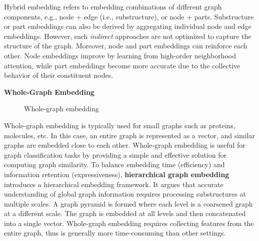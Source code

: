 Hybrid embedding refers to embedding combinations of different graph components, e.g., node + edge (i.e., substructure), or node + parts. Substructure or part embeddings can also be derived by aggregating individual node and edge embeddings. However, such \textit{indirect} approaches are not optimized to capture the structure of the graph. Moreover, node and part embeddings can reinforce each other. Node embeddings improve by learning from high-order neighborhood attention, while part embeddings become more accurate due to the collective behavior of their constituent nodes.

\textbf{Whole-Graph Embedding}


\begin{figure}[htp]
	\centering
	
	
	\caption{Whole-graph embedding}
	\label{fig:wholeGraphEmbedding}
\end{figure}

Whole-graph embedding is typically used for small graphs such as proteins, molecules, etc. In this case, an entire graph is represented as a vector, and similar graphs are embedded close to each other. Whole-graph embedding is useful for graph classification tasks by providing a simple and effective solution for computing graph similarity. To balance embedding time (efficiency) and information retention (expressiveness), \textbf{hierarchical graph embedding} \cite{mousavi2017hierarchical} introduces a hierarchical embedding framework. It argues that accurate understanding of global graph information requires processing substructures at multiple scales. A graph pyramid is formed where each level is a coarsened graph at a different scale. The graph is embedded at all levels and then concatenated into a single vector. Whole-graph embedding requires collecting features from the entire graph, thus is generally more time-consuming than other settings.


